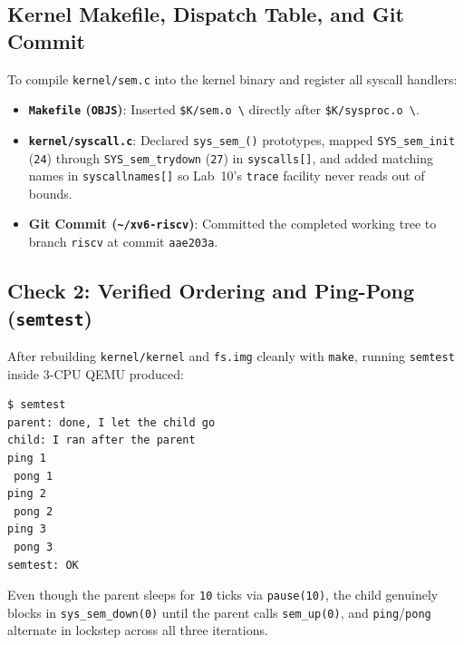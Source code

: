 \documentclass[12pt,a4paper]{article}
\begin{document}
\subsection{Kernel Makefile, Dispatch Table, and Git Commit}
To compile \texttt{kernel/\allowbreak sem.c} into the kernel binary and register all syscall handlers:
\begin{itemize}
    \item \textbf{\texttt{Makefile} (\texttt{OBJS})}: Inserted \texttt{\$K/\allowbreak sem.o \textbackslash} directly after \texttt{\$K/\allowbreak sysproc.o \textbackslash}.
    \item \textbf{\texttt{kernel/\allowbreak syscall.c}}: Declared \texttt{sys\_\allowbreak sem\_\allowbreak *()} prototypes, mapped \texttt{SYS\_\allowbreak sem\_\allowbreak init} (\texttt{24}) through \texttt{SYS\_\allowbreak sem\_\allowbreak trydown} (\texttt{27}) in \texttt{syscalls[]}, and added matching names in \texttt{syscallnames[]} so Lab~10's \texttt{trace} facility never reads out of bounds.
    \item \textbf{Git Commit (\texttt{\textasciitilde/xv6-riscv})}: Committed the completed working tree to branch \texttt{riscv} at commit \texttt{aae203a}.
\end{itemize}

\newpage
\subsection{Check 2: Verified Ordering and Ping-Pong (\texttt{semtest})}
After rebuilding \texttt{kernel/\allowbreak kernel} and \texttt{fs.img} cleanly with \texttt{make}, running \texttt{semtest} inside 3-CPU QEMU produced:
\begin{lstlisting}[style=consolestyle, caption={Observed Check 2 output with kernel semaphores enabled}]
$ semtest
parent: done, I let the child go
child: I ran after the parent
ping 1
 pong 1
ping 2
 pong 2
ping 3
 pong 3
semtest: OK
\end{lstlisting}
Even though the parent sleeps for \texttt{10} ticks via \texttt{pause(10)}, the child genuinely blocks in \texttt{sys\_\allowbreak sem\_\allowbreak down(0)} until the parent calls \texttt{sem\_\allowbreak up(0)}, and \texttt{ping}/\texttt{pong} alternate in lockstep across all three iterations.

\end{document}
